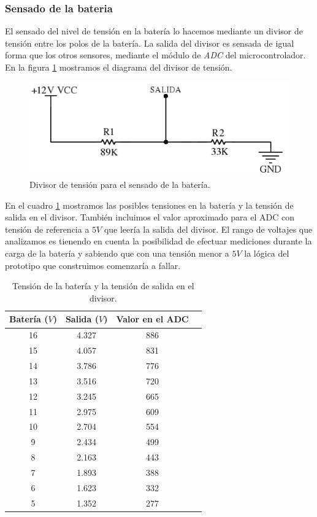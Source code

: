 \subsubsection{Sensado de la bateria}
\label{h_sensado_bateria}

El sensado del nivel de tensi\'on en la bater\'ia lo hacemos mediante un divisor de tensi\'on entre los polos de la bater\'ia.
La salida del divisor es sensada de igual forma que los otros sensores, mediante el m\'odulo de \emph{ADC} del microcontrolador.
En la figura \ref{hF_bateria_diagrama} mostramos el diagrama del divisor de tensi\'on.

\begin{figure}[ht]
	\centering
	\includegraphics[scale=0.35]{figuras/bateria.png}
	\caption{Divisor de tensi\'on para el sensado de la bater\'ia.}
	\label{hF_bateria_diagrama}
\end{figure}

En el cuadro \ref{hT_bateria_divT} mostramos las posibles tensiones en la bater\'ia y la tensi\'on de salida en el divisor.
Tambi\'en incluimos el valor aproximado para el ADC con tensi\'on de referencia a $5V$ que leer\'ia la salida del divisor.
El rango de voltajes que analizamos es tienendo en cuenta la posibilidad de efectuar mediciones durante la carga de la bater\'ia
y sabiendo que con una tensi\'on menor a $5 V$ la l\'ogica del prototipo que construimos comenzar\'ia a fallar.

\begin{table}[ht]
	\begin{center}
		\begin{tabular}{|c|c|c|c|}
			\hline
			Bater\'ia ($V$) & Salida ($V$) & Valor en el ADC \\
			\hline
			16 & 4.327 & 886 \\
			15 & 4.057 & 831 \\
			14 & 3.786 & 776 \\
			13 & 3.516 & 720 \\
			12 & 3.245 & 665 \\
			11 & 2.975 & 609 \\
			10 & 2.704 & 554 \\
			 9 & 2.434 & 499 \\
			 8 & 2.163 & 443 \\
			 7 & 1.893 & 388 \\
			 6 & 1.623 & 332 \\
			 5 & 1.352 & 277 \\
			\hline
		\end{tabular}
	\end{center}
	\caption{Tensi\'on de la bater\'ia y la tensi\'on de salida en el divisor.}
	\label{hT_bateria_divT}
\end{table}

